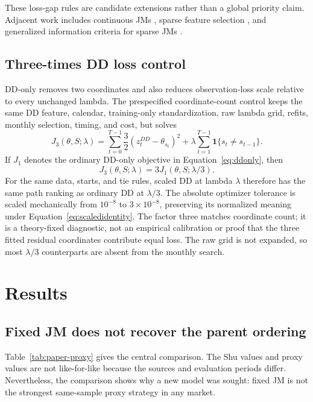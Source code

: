 \documentclass[11pt]{article}
\newcommand{\ind}{\mathbf{1}}
\begin{document}
These loss-gap rules are candidate extensions rather than a global priority
claim. Adjacent work includes continuous JMs \citep{aydinhan2024}, sparse
feature selection \citep{nystrup2021,cortese2023}, and generalized information
criteria for sparse JMs \citep{cortese2024}.

\subsection{Three-times DD loss control}

DD-only removes two coordinates and also reduces observation-loss scale
relative to every unchanged lambda. The prespecified coordinate-count control
keeps the same DD feature, calendar, training-only standardization, raw lambda
grid, refits, monthly selection, timing, and cost, but solves
\begin{equation}
J_3(\theta,S;\lambda)
=\sum_{t=0}^{T-1}\frac32(z^{DD}_t-\theta_{s_t})^2
+\lambda\sum_{t=1}^{T-1}\ind\{s_t\ne s_{t-1}\}.
\label{eq:scaleddd}
\end{equation}
If \(J_1\) denotes the ordinary DD-only objective in
Equation~\eqref{eq:ddonly}, then
\begin{equation}
J_3(\theta,S;\lambda)=3J_1(\theta,S;\lambda/3).
\label{eq:scaledidentity}
\end{equation}
For the same data, starts, and tie rules, scaled DD at lambda \(\lambda\)
therefore has the same path ranking as ordinary DD at \(\lambda/3\). The
absolute optimizer tolerance is scaled mechanically from \(10^{-8}\) to
\(3\times10^{-8}\), preserving its normalized meaning under
Equation~\eqref{eq:scaledidentity}. The factor three matches coordinate count;
it is a theory-fixed diagnostic, not an empirical calibration or proof that the
three fitted residual coordinates contribute equal loss. The raw grid is not
expanded, so most \(\lambda/3\) counterparts are absent from the monthly search.

\section{Results}

\subsection{Fixed JM does not recover the parent ordering}

Table~\ref{tab:paper-proxy} gives the central comparison. The Shu values and
proxy values are not like-for-like because the sources and evaluation periods
differ. Nevertheless, the comparison shows why a new model was sought: fixed
JM is not the strongest same-sample proxy strategy in any market.
\end{document}
